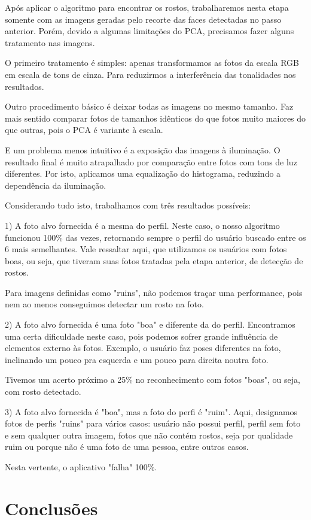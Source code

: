 \documentclass[10pt,a4paper]{article}
\begin{document}
Após aplicar o algoritmo para encontrar os rostos, trabalharemos nesta etapa somente com as imagens geradas pelo recorte das faces detectadas no passo anterior. Porém, devido a algumas limitações do PCA, precisamos fazer alguns tratamento nas imagens.

	O primeiro tratamento é simples: apenas transformamos as fotos da escala RGB em escala de tons de cinza. Para reduzirmos a interferência das tonalidades nos resultados.

	Outro procedimento básico é deixar todas as imagens no mesmo tamanho. Faz mais sentido comparar fotos de tamanhos idênticos do que fotos muito maiores do que outras, pois o PCA é variante à escala.

	E um problema menos intuitivo é a exposição das imagens à iluminação. O resultado final é muito atrapalhado por comparação entre fotos com tons de luz diferentes. Por isto, aplicamos uma equalização do histograma, reduzindo a dependência da iluminação.

	Considerando tudo isto, trabalhamos com três resultados possíveis:

	1) A foto alvo fornecida é a mesma do perfil. Neste caso, o nosso algoritmo funcionou 100\% das vezes, retornando sempre o perfil do usuário buscado entre os 6 mais semelhantes. Vale ressaltar aqui, que utilizamos os usuários com fotos boas, ou seja, que tiveram suas fotos tratadas pela etapa anterior, de detecção de rostos.

	Para imagens definidas como "ruins", não podemos traçar uma performance, pois nem ao menos conseguimos detectar um rosto na foto.

	2) A foto alvo fornecida é uma foto "boa" e diferente da do perfil. Encontramos uma certa dificuldade neste caso, pois podemos sofrer grande influência de elementos externo às fotos. Exemplo, o usuário faz poses diferentes na foto, inclinando um pouco pra esquerda e um pouco para direita noutra foto.

	Tivemos um acerto próximo a 25\% no reconhecimento com fotos "boas", ou seja, com rosto detectado.

	3) A foto alvo fornecida é "boa", mas a foto do perfi é "ruim". Aqui, designamos fotos de perfis "ruins" para vários casos: usuário não possui perfil, perfil sem foto e sem qualquer outra imagem, fotos que não contém rostos, seja por qualidade ruim ou porque não é uma foto de uma pessoa, entre outros casos.

	Nesta vertente, o aplicativo "falha" 100\%.
\section{Conclusões}
\end{document}
